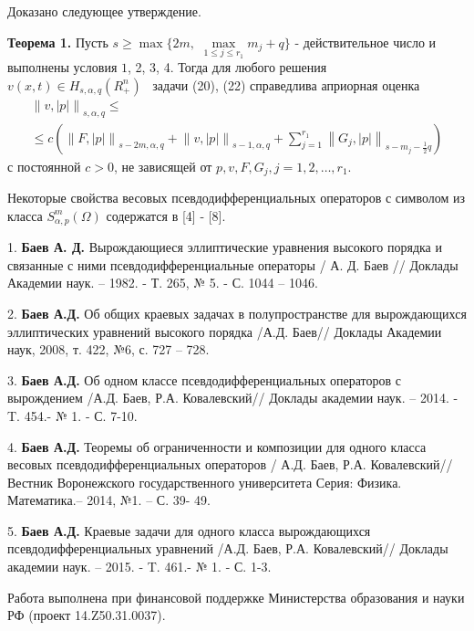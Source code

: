 Доказано следующее утверждение.

\textbf{Теорема 1.} Пусть $s \geqslant \max \{2m,\,\,\mathop {\max }\limits_{1 \leqslant
j \leqslant r_1 } m_j + q\}$ - действительное число и выполнены условия $1$, 2, 3,
4. Тогда для любого решения $v(x,t) \in H_{s,\alpha ,q} (R_ + ^n )\,\,\,$
задачи (20), (22) справедлива априорная оценка
\begin{multline*}
\left\| {v,\left| p \right|} \right\|_{s,\alpha ,q} \leqslant
\\ \leqslant
c(\left\| {F,\left|
p \right|} \right\|_{s - 2m,\alpha ,q} + \left\| {v,\left| p \right|}
\right\|_{s - 1,\alpha ,q} + \sum\limits_{j = 1}^{r_1 } {\left\| {G_j
,\left| p \right|} \right\|} _{s - m_j - \frac{1}{2}q}
)
\end{multline*}
с постоянной $c > 0$, не зависящей от
$p, v, F, G_j , j = 1,2,\ldots, r_1$.



Некоторые свойства весовых псевдодифференциальных операторов с символом из
класса $S_{\alpha ,p}^m (\Omega )$ содержатся в [4] - [8].

\litlist

1. {\bf Баев А. Д.} Вырождающиеся эллиптические уравнения высокого порядка и
связанные с ними псевдодифференциальные операторы / А. Д. Баев // Доклады
Академии наук. -- 1982. - Т. 265, № 5. - С. 1044 -- 1046.

2. {\bf Баев А.Д.} Об общих краевых задачах в полупространстве для вырождающихся
эллиптических уравнений высокого порядка /А.Д. Баев// Доклады Академии наук,
2008, т. 422, №6, с. 727 -- 728.

3. {\bf Баев А.Д.} Об одном классе псевдодифференциальных операторов с вырождением
/А.Д. Баев, Р.А. Ковалевский// Доклады академии наук. -- 2014. - T. 454.- №
1. - С. 7-10.

4. {\bf Баев А.Д.} Теоремы об ограниченности и композиции для одного класса весовых
псе\-в\-до\-диф\-фе\-ре\-н\-ци\-а\-ль\-ных операторов / А.Д. Баев, Р.А. Ковалевский// Вестник
Воронежского государственного университета Серия: Физика. Математика.--
2014, №1. -- С. 39- 49.

5. {\bf Баев А.Д.} Краевые задачи для одного класса вырождающихся
псевдодифференциальных уравнений /А.Д. Баев, Р.А. Ковалевский// Доклады
академии наук. -- 2015. - T. 461.- № 1. - С. 1-3.



Работа выполнена при финансовой поддержке Министерства образования и науки
РФ (проект 14.Z50.31.0037).

